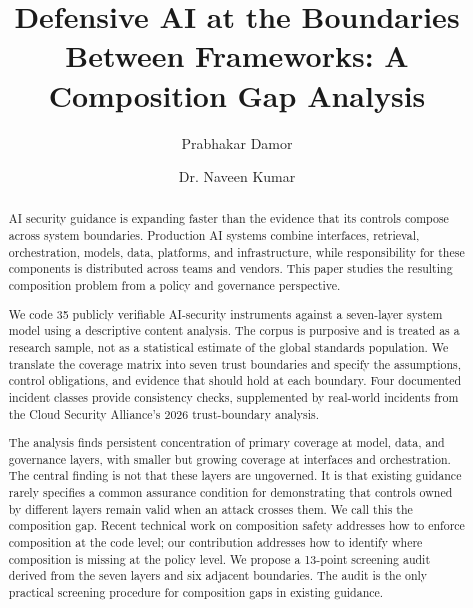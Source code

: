 \documentclass[runningheads]{llncs}
\begin{document}
%
\title{Defensive AI at the Boundaries Between Frameworks: A Composition Gap Analysis}
%
%
\author{Prabhakar Damor\and
  Dr. Naveen Kumar}
%
%
%
\maketitle
\begin{abstract}
AI security guidance is expanding faster than the evidence that its controls compose across system boundaries. Production AI systems combine interfaces, retrieval, orchestration, models, data, platforms, and infrastructure, while responsibility for these components is distributed across teams and vendors. This paper studies the resulting composition problem from a policy and governance perspective.

We code 35 publicly verifiable AI-security instruments against a seven-layer system model using a descriptive content analysis. The corpus is purposive and is treated as a research sample, not as a statistical estimate of the global standards population. We translate the coverage matrix into seven trust boundaries and specify the assumptions, control obligations, and evidence that should hold at each boundary. Four documented incident classes provide consistency checks, supplemented by real-world incidents from the Cloud Security Alliance's 2026 trust-boundary analysis.

The analysis finds persistent concentration of primary coverage at model, data, and governance layers, with smaller but growing coverage at interfaces and orchestration. The central finding is not that these layers are ungoverned. It is that existing guidance rarely specifies a common assurance condition for demonstrating that controls owned by different layers remain valid when an attack crosses them. We call this the composition gap. Recent technical work on composition safety addresses how to enforce composition at the code level; our contribution addresses how to identify where composition is missing at the policy level. We propose a 13-point screening audit derived from the seven layers and six adjacent boundaries. The audit is the only practical screening procedure for composition gaps in existing guidance.
\end{abstract}

\end{document}
